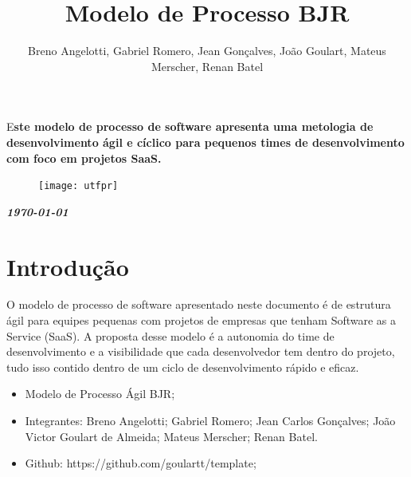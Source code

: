 \documentclass[	DIV=calc,%
							paper=a4,%
							fontsize=12pt,%
							onecolumn]{scrartcl}	 					%
\title{Modelo de Processo BJR}					%
\author{Breno Angelotti, Gabriel Romero, Jean Gonçalves, João Goulart, Mateus Merscher, Renan Batel }  	%
\date{}																				%
\newcommand{\initial}[1]{%
     \lettrine[lines=3,lhang=0.3,nindent=0em]{
     				\color{DarkGoldenrod}
     				{\textsf{#1}}}{}}
\begin{document}
\maketitle
\thispagestyle{fancy} 	
\thispagestyle{empty}		%




\initial{E}\textbf{ste modelo de processo de software apresenta uma metologia de desenvolvimento ágil e cíclico para pequenos times de desenvolvimento com foco em projetos SaaS.}

\begin{figure}
	\centering
	\texttt{[image: utfpr]}
\end{figure}

\vspace{3cm}
\centerline{\textit{\textbf{\today}}}

\clearpage
    \renewcommand*\listfigurename{Lista de figuras}
\listoffigures


\clearpage
\renewcommand{\contentsname}{Sumário}
\tableofcontents
\clearpage

\section{Introdução}
O modelo de processo de software apresentado neste documento é de estrutura ágil para equipes pequenas com projetos de empresas que tenham Software as a Service (SaaS)\cite{saas}. A proposta desse modelo é a autonomia do time de desenvolvimento e a visibilidade que cada desenvolvedor tem dentro do projeto, tudo isso contido dentro de um ciclo de desenvolvimento rápido e eficaz.

\begin{itemize}
	\item Modelo de Processo Ágil BJR;
	\item Integrantes: Breno Angelotti; Gabriel Romero; Jean Carlos Gonçalves; João Victor Goulart de Almeida; Mateus Merscher; Renan Batel.
	\item Github: https://github.com/goulartt/template;
\end{itemize}
\end{document}
